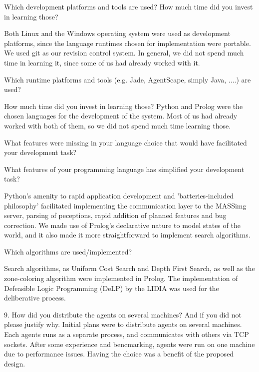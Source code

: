 \begin{question}
\begin{question}
\begin{question}
Which development platforms and tools are used? How much time did you
invest in learning those?  
\end{question}

Both Linux and the Windows operating system were
used as development platforms, since the language runtimes chosen for
implementation were portable.  We used git as our revision control system. In
general, we did not spend much time in learning it, since some of us had
already worked with it.

\begin{question}
Which runtime platforms and tools (e.g. Jade, AgentScape, simply Java,
....) are used? 
\end{question}

How much time did you invest in learning those?  Python and
Prolog were the chosen languages for the development of the system. Most of us
had already worked with both of them, so we did not spend much time learning
those.

\begin{question}
What features were missing in your language choice that would have
facilitated your development task?
\end{question}

\begin{question}
What features of your programming language has simplified your development
task?  
\end{question}
Python's amenity to rapid application development and
'batteries-included philosophy' facilitated implementing the communication
layer to the MASSimg server, parsing of peceptions, rapid addition of planned
features and bug correction.  We made use of Prolog's declarative nature to
model states of the world, and it also made it more straightforward to
implement search algorithms.

\begin{question}
Which algorithms are used/implemented?  
\end{question}
Search algorithms, as Uniform Cost
Search and Depth First Search, as well as the zone-coloring algorithm were
implemented in Prolog.  The implementation of Defeasible Logic Programming
(DeLP) by the LIDIA was used for the deliberative process.

9. How did you distribute the agents on several machines? And if you did not
please justify why.  Initial plans were to distribute agents on several
machines. Each agents runs as a separate process, and communicates with others
via TCP sockets. After some experience and bencmarking, agents were run on one
machine due to performance issues. Having the choice was a benefit of the
proposed design.


\end{question}
\end{question}
